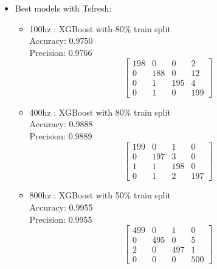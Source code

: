 \documentclass{article}
\begin{document}
\begin{itemize}
\begin{itemize}
        \end{itemize}
    \item Best models with Tsfresh:
        \begin{itemize}
            \item 100hz : XGBoost with 80\% train split 
            \\
            Accuracy: 0.9750
            \\
            Precision: 0.9766
            \[
            \begin{bmatrix}
            198 & 0 & 0 & 2 \\
            0 & 188 & 0 & 12 \\
            0 & 1 & 195 & 4 \\
            0 & 1 & 0 & 199
            \end{bmatrix}
            \]

            \item 400hz : XGBoost with 80\% train split
            \\
            Accuracy: 0.9888
            \\
            Precision: 0.9889
            \[
            \begin{bmatrix}
            199 & 0   & 1   & 0 \\
            0   & 197 & 3   & 0 \\
            1   & 1   & 198 & 0 \\
            0   & 1   & 2   & 197
            \end{bmatrix}
            \]
            

            \item 800hz : XGBoost with 50\% train split
            \\
            Accuracy: 0.9955
            \\
            Precision: 0.9955
            \\
            \[
            \begin{bmatrix}
            499 & 0   & 1   & 0 \\
            0   & 495 & 0   & 5 \\
            2   & 0   & 497 & 1 \\
            0   & 0   & 0   & 500
            \end{bmatrix}
            \]



\end{itemize}
\end{itemize}
\end{document}
